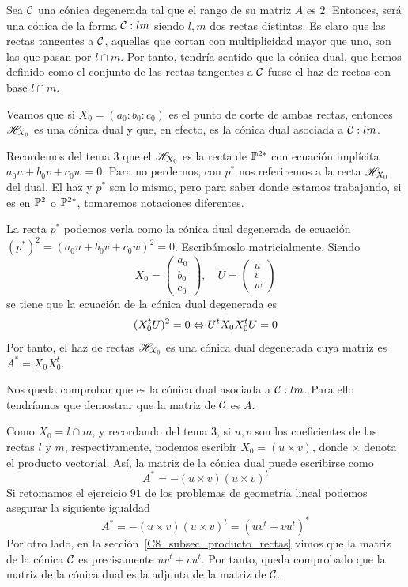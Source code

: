 Sea $\mathcal{C}$ una cónica degenerada tal que el rango de su matriz $A$ es $2$. Entonces, será una cónica de la forma $\mathcal{C}:l m$ siendo $l,m$ dos rectas distintas. Es claro que las rectas tangentes a $\mathcal{C}$, aquellas que cortan con multiplicidad mayor que uno, son las que pasan por $l\cap m$. Por tanto, tendría sentido que la cónica dual, que hemos definido como el conjunto de las rectas tangentes a $\mathcal{C}$ fuese el haz de rectas con base $l\cap m$.

Veamos que si $X_0=(a_0:b_0:c_0)$ es el punto de corte de ambas rectas, entonces $\mathscr{H}_{X_0}$ es una cónica dual y que, en efecto, es la cónica dual asociada a $\mathcal{C}:l m$.

Recordemos del tema $3$ que el $\mathscr{H}_{X_0}$ es la recta de $\mathbb{P}^{2*}$ con ecuación implícita $a_0u+b_0v+c_0w=0$. Para no perdernos, con $p^*$ nos referiremos a la recta $\mathscr{H}_{X_0}$ del dual. El haz y $p^*$ son lo mismo, pero para saber donde estamos trabajando, si es en $\mathbb{P}^2$ o $\mathbb{P}^{2*}$, tomaremos notaciones diferentes.

La recta $p^*$ podemos verla como la cónica dual degenerada de ecuación $(p^*)^2=(a_0u+b_0v+c_0w)^2=0$. Escribámoslo matricialmente. Siendo 
\[X_0=\left( \begin{array}{c}
a_0\\b_0\\c_0
\end{array}\right) ,\quad U=\left( \begin{array}{c}
u\\v\\w
\end{array}\right) \]
se tiene que la ecuación de la cónica dual degenerada es
\[(X_0^tU)^2=0\Leftrightarrow U^tX_0X_0^tU=0\]
Por tanto, el haz de rectas $\mathscr{H}_{X_0}$ es una cónica dual degenerada cuya matriz es $A^*=X_0X_0^t$.

Nos queda comprobar que es la cónica dual asociada a $\mathcal{C}:lm$. Para ello tendríamos que demostrar que la matriz de $\mathcal{C}$ es $A$.

Como $X_0=l\cap m$, y recordando del tema $3$, si $u,v$ son los coeficientes de las rectas $l$ y $m$, respectivamente, podemos escribir $X_0=(u\times v)$, donde $\times$ denota el producto vectorial. Así, la matriz de la cónica dual puede escribirse como
\begin{equation}
	A^*=-(u\times v)(u\times v)^t
\end{equation}
Si retomamos el ejercicio $91$ de los problemas de geometría lineal podemos asegurar la siguiente igualdad
\begin{equation}
	A^*=-(u\times v)(u\times v)^t=(uv^t+vu^t)^*
\end{equation}
Por otro lado, en la sección~\ref{C8_subsec_producto_rectas} vimos que la matriz de la cónica $\mathcal{C}$ es precisamente $uv^t+vu^t$. Por tanto, queda comprobado que la matriz de la cónica dual es la adjunta de la matriz de $\mathcal{C}$.

